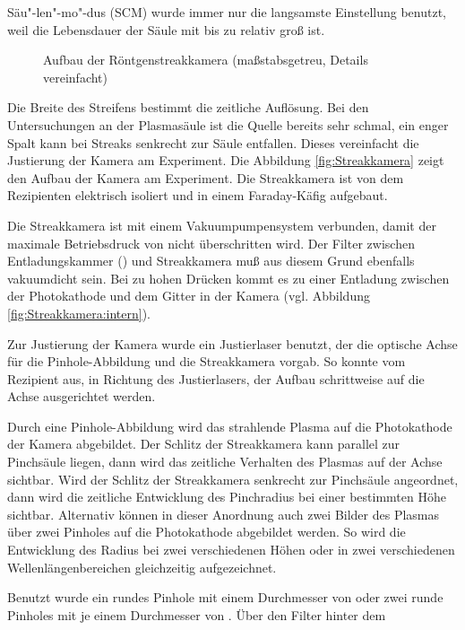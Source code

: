 Säu"-len"-mo"-dus (SCM) wurde immer nur die langsamste Einstellung
benutzt, weil die Lebensdauer der Säule mit bis zu 
relativ groß ist.
%
\par
\begin{figure}[H]
  \center
  \caption{Aufbau der Röntgenstreakkamera (maßstabsgetreu, Details vereinfacht)}
  \label{fig:Streakkamera}
\end{figure}
%
\par
Die Breite des Streifens bestimmt die zeitliche Auflösung. Bei den
Untersuchungen an der Plasmasäule ist die Quelle bereits sehr
schmal, ein enger Spalt kann bei Streaks senkrecht zur Säule
entfallen. Dieses vereinfacht die Justierung der Kamera am
Experiment. Die Abbildung \vref{fig:Streakkamera} zeigt den Aufbau
der Kamera am Experiment. Die Streakkamera ist von dem Rezipienten
elektrisch isoliert und in einem Faraday-Käfig aufgebaut.
\par
Die Streakkamera ist mit einem Vakuumpumpensystem verbunden, damit der
maximale Betriebsdruck von  nicht überschritten wird.
Der Filter zwischen Entladungskammer () und
Streakkamera muß aus diesem Grund ebenfalls vakuumdicht sein. Bei zu
hohen Drücken kommt es zu einer Entladung zwischen der Photokathode und
dem Gitter in der Kamera (vgl. Abbildung
\vref{fig:Streakkamera:intern}).
\par
Zur Justierung der Kamera wurde ein Justierlaser benutzt, der die
optische Achse für die Pinhole-Abbildung und die Streakkamera vorgab.
So konnte vom Rezipient aus, in Richtung des Justierlasers, der Aufbau
schrittweise auf die Achse ausgerichtet werden.
\par
Durch eine Pinhole-Abbildung wird das strahlende Plasma auf die
Photokathode der Kamera abgebildet. Der Schlitz der Streakkamera kann
parallel zur Pinchsäule liegen, dann wird das zeitliche Verhalten des
Plasmas auf der Achse sichtbar. Wird der Schlitz der Streakkamera
senkrecht zur Pinchsäule angeordnet, dann wird die zeitliche
Entwicklung des Pinchradius bei einer bestimmten Höhe sichtbar.
Alternativ können in dieser Anordnung auch zwei Bilder des Plasmas über
zwei Pinholes auf die Photokathode abgebildet werden. So wird die
Entwicklung des Radius bei zwei verschiedenen Höhen oder in zwei
verschiedenen Wellenlängenbereichen gleichzeitig aufgezeichnet.
\par
Benutzt wurde ein rundes Pinhole mit einem Durchmesser von
 oder zwei runde Pinholes mit je einem
Durchmesser von . Über den Filter hinter dem
